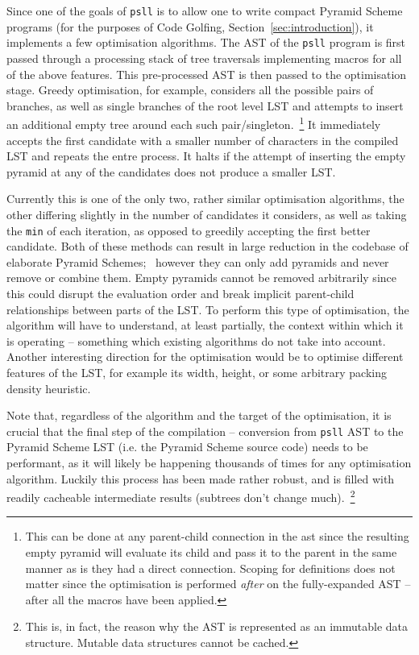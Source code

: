 \documentclass[aip,jcp,reprint,footinbib]{revtex4-1}
\makeatletter
\let\tt\texttt
\newcommand\psll{\texttt{psll}\xspace}
\renewcommand\paragraph{\@startsection{paragraph}{4}{\parindent}{\parskip}{-1em}{\normalfont \normalsize \bfseries}}
\makeatother
\begin{document}
\paragraph{Optimisation} Since one of the goals of \psll is to allow one to write compact Pyramid Scheme programs (for the purposes of Code Golfing, Section~\ref{sec:introduction}), it implements a few optimisation algorithms. The AST of the \psll program is first passed through a processing stack of tree traversals implementing macros for all of the above features. This pre-processed AST is then passed to the optimisation stage. Greedy optimisation, for example, considers all the possible pairs of branches, as well as single branches of the root level LST and attempts to insert an additional empty tree around each such pair/singleton.~\footnote{This can be done at any parent-child connection in the ast since the resulting empty pyramid will evaluate its child and pass it to the parent in the same manner as is they had a direct connection. Scoping for definitions does not matter since the optimisation is performed \emph{after} on the fully-expanded AST -- after all the macros have been applied.} It immediately accepts the first candidate with a smaller number of characters in the compiled LST and repeats the entre process. It halts if the attempt of inserting the empty pyramid at any of the candidates does not produce a smaller LST.

Currently this is one of the only two, rather similar optimisation algorithms, the other differing slightly in the number of candidates it considers, as well as taking the \tt{min} of each iteration, as opposed to greedily accepting the first better candidate. Both of these methods can result in large reduction in the codebase of elaborate Pyramid Schemes;~\cite{psnegation_answer} however they can only add pyramids and never remove or combine them. Empty pyramids cannot be removed arbitrarily since this could disrupt the evaluation order and break implicit parent-child relationships between parts of the LST. To perform this type of optimisation, the algorithm will have to understand, at least partially, the context within which it is operating -- something which existing algorithms do not take into account. Another interesting direction for the optimisation would be to optimise different features of the LST, for example its width, height, or some arbitrary packing density heuristic.

Note that, regardless of the algorithm and the target of the optimisation, it is crucial that the final step of the compilation -- conversion from \psll AST to the Pyramid Scheme LST (i.e. the Pyramid Scheme source code) needs to be performant, as it will likely be happening thousands of times for any optimisation algorithm. Luckily this process has been made rather robust, and is filled with readily cacheable intermediate results (subtrees don't change much).~\footnote{This is, in fact, the reason why the AST is represented as an immutable data structure. Mutable data structures cannot be cached.}
\end{document}
